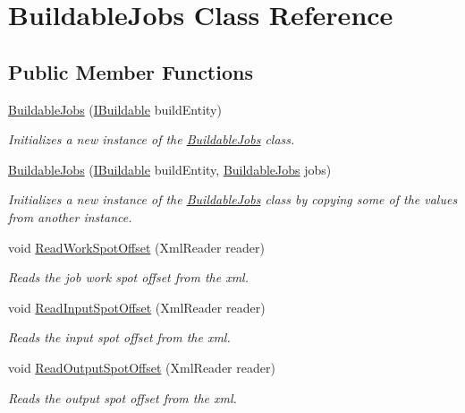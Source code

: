 \hypertarget{class_buildable_jobs}{}\section{Buildable\+Jobs Class Reference}
\label{class_buildable_jobs}
\subsection*{Public Member Functions}
\begin{DoxyCompactItemize}
\item 
\hyperlink{class_buildable_jobs_adae8130157e0004cd6cf62275698c81f}{Buildable\+Jobs} (\hyperlink{interface_i_buildable}{I\+Buildable} build\+Entity)
\begin{DoxyCompactList}\small\item\em Initializes a new instance of the \hyperlink{class_buildable_jobs}{Buildable\+Jobs} class. \end{DoxyCompactList}\item 
\hyperlink{class_buildable_jobs_a0039b45683227d612bb6a917cbc3b42d}{Buildable\+Jobs} (\hyperlink{interface_i_buildable}{I\+Buildable} build\+Entity, \hyperlink{class_buildable_jobs}{Buildable\+Jobs} jobs)
\begin{DoxyCompactList}\small\item\em Initializes a new instance of the \hyperlink{class_buildable_jobs}{Buildable\+Jobs} class by copying some of the values from another instance. \end{DoxyCompactList}\item 
void \hyperlink{class_buildable_jobs_a1d1403862cca825858202843fbee4b74}{Read\+Work\+Spot\+Offset} (Xml\+Reader reader)
\begin{DoxyCompactList}\small\item\em Reads the job work spot offset from the xml. \end{DoxyCompactList}\item 
void \hyperlink{class_buildable_jobs_afdf239ec2f81f9156844d271abe99cba}{Read\+Input\+Spot\+Offset} (Xml\+Reader reader)
\begin{DoxyCompactList}\small\item\em Reads the input spot offset from the xml. \end{DoxyCompactList}\item 
void \hyperlink{class_buildable_jobs_a555d096b725e42460648535bfc9bec63}{Read\+Output\+Spot\+Offset} (Xml\+Reader reader)
\begin{DoxyCompactList}\small\item\em Reads the output spot offset from the xml. \end{DoxyCompactList}\item 

\end{DoxyCompactItemize}
